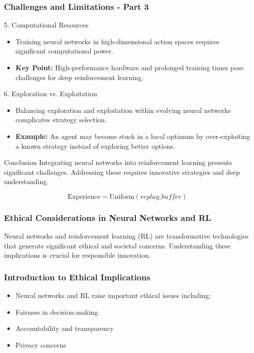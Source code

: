 \documentclass[aspectratio=169]{beamer}
\begin{document}
\begin{frame}[fragile]
    \frametitle{Challenges and Limitations - Part 3}
    \begin{block}{5. Computational Resources}
        \begin{itemize}
            \item Training neural networks in high-dimensional action spaces requires significant computational power.
            \item \textbf{Key Point:} High-performance hardware and prolonged training times pose challenges for deep reinforcement learning.
        \end{itemize}
    \end{block}
    
    \begin{block}{6. Exploration vs. Exploitation}
        \begin{itemize}
            \item Balancing exploration and exploitation within evolving neural networks complicates strategy selection.
            \item \textbf{Example:} An agent may become stuck in a local optimum by over-exploiting a known strategy instead of exploring better options.
        \end{itemize}
    \end{block}

    \begin{block}{Conclusion}
        Integrating neural networks into reinforcement learning presents significant challenges. Addressing these requires innovative strategies and deep understanding.
    \end{block}
    
    \begin{equation}
        \text{Experience} \sim \text{Uniform}(replay\_buffer)
    \end{equation}
\end{frame}

\begin{frame}[fragile]
    \frametitle{Ethical Considerations in Neural Networks and RL}
    Neural networks and reinforcement learning (RL) are transformative technologies that generate significant ethical and societal concerns.  
    Understanding these implications is crucial for responsible innovation.
\end{frame}

\begin{frame}[fragile]
    \frametitle{Introduction to Ethical Implications}
    \begin{itemize}
        \item Neural networks and RL raise important ethical issues including:
        \item Fairness in decision-making
        \item Accountability and transparency
        \item Privacy concerns
    \end{itemize}
\end{frame}
\end{document}
